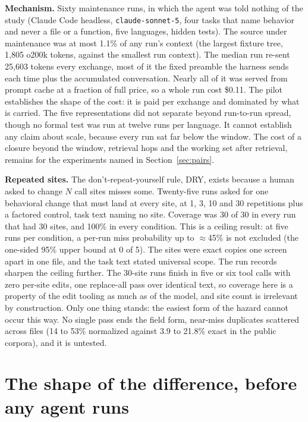 \documentclass[journal]{IEEEtran}
\begin{document}
\textbf{Mechanism.} Sixty maintenance runs, in which the agent was told
nothing of the study (Claude Code headless, \texttt{claude-sonnet-5}, four
tasks that name behavior and never a file or a function, five languages,
hidden tests). The source under maintenance was at most 1.1\% of any run's context
(the largest fixture tree, 1,805 o200k tokens, against the smallest run
context). The median run re-sent 25,603 tokens every
exchange, most of it the fixed preamble the harness sends each time plus the
accumulated conversation. Nearly all of it was served from prompt cache at a
fraction of full price, so a whole run cost \$0.11. The pilot establishes the
shape of the cost: it is paid per exchange and dominated by what is
carried. The five representations did not separate beyond
run-to-run spread, though no formal test was run at twelve runs per
language. It cannot establish any claim about scale, because every run sat far
below the window. The cost of a closure beyond the window, retrieval hops and the working
set after retrieval, remains for the experiments named in
Section~\ref{sec:pairs}.

\textbf{Repeated sites.} The don't-repeat-yourself rule, DRY, exists because
a human asked to change $N$ call sites misses some. Twenty-five runs asked for one behavioral change that must
land at every site, at 1, 3, 10 and 30 repetitions plus a factored control,
task text naming no site. Coverage was 30 of 30 in every run that had 30
sites, and 100\% in every condition. This is a ceiling result: at five
runs per condition, a per-run miss probability up to
$\approx$45\% is not excluded (the one-sided 95\% upper bound at 0 of
5). The sites were exact copies one screen apart in one file, and the
task text stated universal scope. The run records sharpen the ceiling further. The 30-site runs
finish in five or six tool calls with zero per-site edits, one
replace-all pass over identical text, so coverage here is a property of
the edit tooling as much as of the model, and site count is irrelevant by
construction. Only one thing stands: the easiest form of the hazard
cannot occur this way. No single pass ends the field form, near-miss
duplicates scattered across files (14 to 53\% normalized against 3.9 to
21.8\% exact in the public corpora), and it is untested.

\section{The shape of the difference, before any agent runs}
\end{document}
